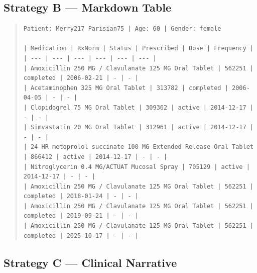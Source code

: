 \subsection{Strategy B --- Markdown Table}
\label{app:strategy_b}

\begin{quote}
\scriptsize
\begin{verbatim}
Patient: Merry217 Parisian75 | Age: 60 | Gender: female

| Medication | RxNorm | Status | Prescribed | Dose | Frequency |
| --- | --- | --- | --- | --- | --- |
| Amoxicillin 250 MG / Clavulanate 125 MG Oral Tablet | 562251 | completed | 2006-02-21 | - | - |
| Acetaminophen 325 MG Oral Tablet | 313782 | completed | 2006-04-05 | - | - |
| Clopidogrel 75 MG Oral Tablet | 309362 | active | 2014-12-17 | - | - |
| Simvastatin 20 MG Oral Tablet | 312961 | active | 2014-12-17 | - | - |
| 24 HR metoprolol succinate 100 MG Extended Release Oral Tablet | 866412 | active | 2014-12-17 | - | - |
| Nitroglycerin 0.4 MG/ACTUAT Mucosal Spray | 705129 | active | 2014-12-17 | - | - |
| Amoxicillin 250 MG / Clavulanate 125 MG Oral Tablet | 562251 | completed | 2018-01-24 | - | - |
| Amoxicillin 250 MG / Clavulanate 125 MG Oral Tablet | 562251 | completed | 2019-09-21 | - | - |
| Amoxicillin 250 MG / Clavulanate 125 MG Oral Tablet | 562251 | completed | 2025-10-17 | - | - |
\end{verbatim}
\end{quote}

\subsection{Strategy C --- Clinical Narrative}
\label{app:strategy_c}

